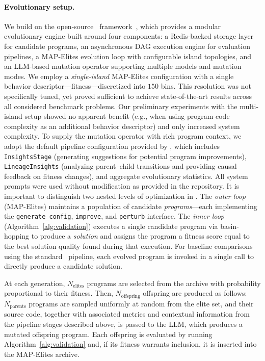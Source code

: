 \documentclass[sigconf]{acmart}
\begin{document}
\paragraph{Evolutionary setup.}
We build on the open-source \gigaevo\ framework~\cite{khrulkov2025gigaevo}, which provides a modular evolutionary engine built around four components: a Redis-backed storage layer for candidate programs, an asynchronous DAG execution engine for evaluation pipelines, a MAP-Elites evolution loop with configurable island topologies, and an LLM-based mutation operator supporting multiple models and mutation modes.
We employ a \emph{single-island} MAP-Elites configuration with a single behavior descriptor---fitness---discretized into $150$ bins. This resolution was not specifically tuned, yet proved sufficient to achieve state-of-the-art results across all considered benchmark problems. Our preliminary experiments with the multi-island setup showed no apparent benefit (e.g., when using program code complexity as an additional behavior descriptor) and only increased system complexity. To supply the mutation operator with rich program context, we adopt the default pipeline configuration provided by \gigaevo, which includes \texttt{InsightsStage} (generating suggestions for potential program improvements), \texttt{LineageInsights} (analyzing parent--child transitions and providing causal feedback on fitness changes), and aggregate evolutionary statistics. All system prompts were used without modification as provided in the repository.
It is important to distinguish two nested levels of optimization in \improvevolve. The \emph{outer loop} (MAP-Elites) maintains a population of candidate \emph{programs}---each implementing the \texttt{generate\allowbreak\_config}, \texttt{improve}, and \texttt{perturb} interface. The \emph{inner loop} (Algorithm~\ref{alg:validation}) executes a single candidate program via basin-hopping to produce a \emph{solution} and assigns the program a fitness score equal to the best solution quality found during that execution. For baseline comparisons using the standard \gigaevo\ pipeline, each evolved program is invoked in a single call to directly produce a candidate solution.

At each generation, $N_{\text{elites}}$ programs are selected from the archive with probability proportional to their fitness. Then, $N_{\text{offspring}}$ offspring are produced as follows: $N_{\text{parents}}$ programs are sampled uniformly at random from the elite set, and their source code, together with associated metrics and contextual information from the pipeline stages described above, is passed to the LLM, which produces a mutated offspring program. Each offspring is evaluated by running Algorithm~\ref{alg:validation} and, if its fitness warrants inclusion, it is inserted into the MAP-Elites archive.
\end{document}
